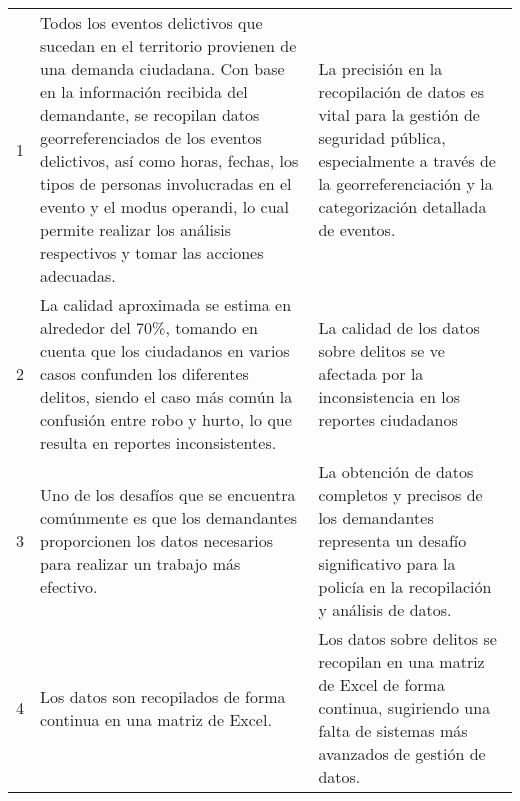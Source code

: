 \begin{longtable}{|l|p{6cm}|p{6cm}|}
    1                                                 & Todos los eventos delictivos que sucedan en el territorio provienen de una demanda ciudadana. Con base en la información recibida del demandante, se recopilan datos georreferenciados de los eventos delictivos, así como horas, fechas, los tipos de personas involucradas en el evento y el modus operandi, lo cual permite realizar los análisis respectivos y tomar las acciones adecuadas. & La precisión en la recopilación de datos es vital para la gestión de seguridad pública, especialmente a través de la georreferenciación y la categorización detallada de eventos.                                            \\
    2                                                 & La calidad aproximada se estima en alrededor del 70\%, tomando en cuenta que los ciudadanos en varios casos confunden los diferentes delitos, siendo el caso más común la confusión entre robo y hurto, lo que resulta en reportes inconsistentes.                                                                                                                                               & La calidad de los datos sobre delitos se ve afectada por la inconsistencia en los reportes ciudadanos                                                                                                                        \\
    3                                                 & Uno de los desafíos que se encuentra comúnmente es que los demandantes proporcionen los datos necesarios para realizar un trabajo más efectivo.                                                                                                                                                                                                                                                  & La obtención de datos completos y precisos de los demandantes representa un desafío significativo para la policía en la recopilación y análisis de datos.                                                                    \\
    4                                                 & Los datos son recopilados de forma continua en una matriz de Excel.                                                                                                                                                                                                                                                                                                                              & Los datos sobre delitos se recopilan en una matriz de Excel de forma continua, sugiriendo una falta de sistemas más avanzados de gestión de datos.                                                                           \\

\end{longtable}
